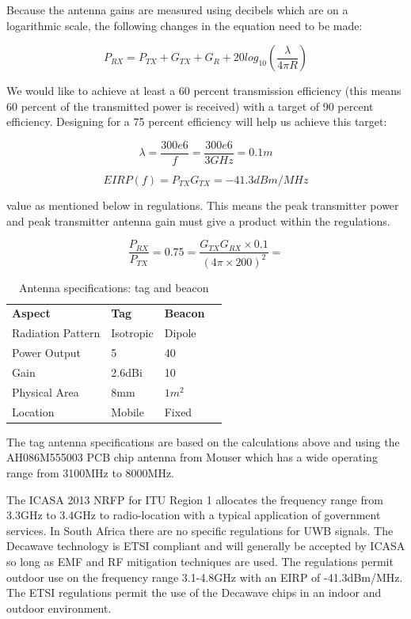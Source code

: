 Because the antenna gains are measured using decibels which are on a logarithmic scale, the following changes in the equation need to be made:

$$P_{RX} = P_{TX} + G_{TX} + G_{R} + 20log_{10}(\frac{\lambda}{4 \pi R})$$

We would like to achieve at least a 60 percent transmission efficiency (this means 60 percent of the transmitted power is received) with a target of 90 percent efficiency. Designing for a 75 percent efficiency will help us achieve this target: 

$$\lambda = \frac{300e6}{f} = \frac{300e6}{3GHz} = 0.1m$$

$$EIRP(f) = P_{TX}G_{TX} = -41.3dBm/MHz$$
\begin{center}
value as mentioned below in regulations. This means the peak transmitter power and peak transmitter antenna gain must give a product within the regulations.
\end{center}

$$\frac{P_{RX}}{P_{TX}} = 0.75 = \frac{G_{TX}G_{RX} \times 0.1}{(4 \pi \times 200)^2} = $$

\begin{table}[H]
\centering
\caption{Antenna specifications: tag and beacon}
\label{my-label}
\begin{tabular}{l l l l}
\textbf{Aspect}                      & \textbf{Tag} & \textbf{Beacon} \\ 
Radiation Pattern    	& Isotropic             & Dipole              \\
Power Output 			& 5                     & 40                     \\
Gain                 	& 2.6dBi                     & 10                    \\
Physical Area 			& 8mm					 & $1m^2$          \\         
Location 				& Mobile                & Fixed                    \\         
\end{tabular}
\end{table}

The tag antenna specifications are based on the calculations above and using the AH086M555003 PCB chip antenna from Mouser which has a wide operating range from 3100MHz to 8000MHz.

\newpage
{}
The ICASA 2013 NRFP for ITU Region 1 allocates the frequency range from 3.3GHz to 3.4GHz to radio-location with a typical application of government services. In South Africa there are no specific regulations for UWB signals. The Decawave technology is ETSI compliant and will generally be accepted by ICASA so long as EMF and RF mitigation techniques are used. The regulations permit outdoor use on the frequency range 3.1-4.8GHz with an EIRP of -41.3dBm/MHz. The ETSI regulations permit the use of the Decawave chips in an indoor and outdoor environment.

